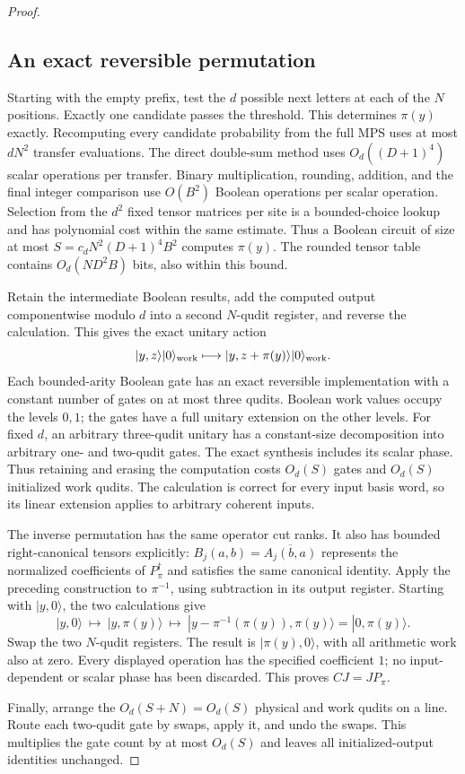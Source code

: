 \documentclass[11pt]{article}
\begin{document}
\begin{proof}
\subsection*{An exact reversible permutation}

Starting with the empty prefix, test the $d$ possible next
letters at each of the $N$ positions. Exactly one candidate
passes the threshold. This determines $\pi(y)$ exactly.
Recomputing every candidate probability from the full MPS uses
at most $dN^2$ transfer evaluations. The direct double-sum
method uses $O_d((D+1)^4)$ scalar operations per transfer.
Binary multiplication, rounding, addition, and the final
integer comparison use $O(B^2)$ Boolean operations per scalar
operation. Selection from the $d^2$ fixed tensor matrices per
site is a bounded-choice lookup and has polynomial cost within
the same estimate. Thus a Boolean circuit of size at most
$S=c_dN^2(D+1)^4B^2$ computes $\pi(y)$.
The rounded tensor table contains
$O_d(ND^2B)$ bits, also within this bound.

Retain the intermediate Boolean results, add the computed output
componentwise modulo $d$ into a second $N$-qudit register, and
reverse the calculation. This gives the exact unitary action
\[
 |y,z\rangle|0\rangle_{\rm work}
       \longmapsto
 |y,z+\pi(y)\rangle|0\rangle_{\rm work}.
\]
Each bounded-arity Boolean gate has an exact reversible
implementation with a constant number of gates on at most
three qudits. Boolean work values occupy the levels $0,1$;
the gates have a full unitary extension on the other levels.
For fixed $d$, an arbitrary three-qudit unitary has a
constant-size decomposition into arbitrary one- and two-qudit
gates. The exact synthesis includes its scalar phase.
Thus retaining and erasing the computation costs $O_d(S)$
gates and $O_d(S)$ initialized work qudits. The calculation is
correct for every input basis word, so its linear extension
applies to arbitrary coherent inputs.

The inverse permutation has the same operator cut ranks.
It also has bounded right-canonical tensors explicitly:
$B_j(a,b)=\overline{A_j(b,a)}$ represents the normalized
coefficients of $P_\pi^\dagger$ and satisfies the same canonical
identity. Apply the preceding construction to $\pi^{-1}$,
using subtraction in its output register. Starting with
$|y,0\rangle$, the two calculations give
\[
 |y,0\rangle\ \longmapsto\
 |y,\pi(y)\rangle\ \longmapsto\
 |y-\pi^{-1}(\pi(y)),\pi(y)\rangle
 =|0,\pi(y)\rangle.
\]
Swap the two $N$-qudit registers. The result is
$|\pi(y),0\rangle$, with all arithmetic work also at zero.
Every displayed operation has the specified coefficient $1$;
no input-dependent or scalar phase has been discarded.
This proves $CJ=JP_\pi$.

Finally, arrange the $O_d(S+N)=O_d(S)$ physical and work qudits
on a line. Route each two-qudit gate by swaps, apply it, and
undo the swaps. This multiplies the gate count by at most
$O_d(S)$ and leaves all initialized-output identities unchanged.
\end{proof}
\end{document}
